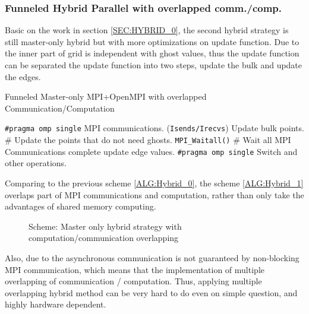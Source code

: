 \subsubsection{Funneled Hybrid Parallel with overlapped comm./comp.}\label{SEC:HYBRID_1}
Basic on the work in section \ref{SEC:HYBRID_0}, the second hybrid strategy is still master-only hybrid but with more optimizations on update 
function. 
Due to the inner part of grid is independent with ghost values, thus the update function can be separated the update function into two steps, 
update the bulk and update the edges.

\begin{algorithm}
  \caption{Funneled Master-only MPI+OpenMPI with overlapped Communication/Computation}
  \label{ALG:Hybrid_1}
  \begin{algorithmic}[1]
      \STATE \texttt{\#pragma omp single}
      \STATE MPI communications. (\texttt{Isends/Irecvs})
        \STATE Update bulk points.                                  \hfill \# Update the points that do not need ghosts.
      \ENDFOR
      \STATE \texttt{MPI\_Waitall()}                                \hfill \# Wait all MPI Communications complete
        \STATE update edge values.                                 
      \ENDFOR
      \STATE \texttt{\#pragma omp single} Switch and other operations.
    \ENDFOR
  \end{algorithmic}
\end{algorithm}
Comparing to the previous scheme \ref{ALG:Hybrid_0}, the scheme \ref{ALG:Hybrid_1} overlaps part of MPI communications and computation, 
rather than only take the advantages of shared memory computing.

\begin{figure}[htbp]
  \centering
  \caption{Scheme: Master only hybrid strategy with computation/communication overlapping}
  \label{FIG:master_only_hybrid_1}
\end{figure}
Also, due to the asynchronous communication is not guaranteed by non-blocking MPI communication,
which means that the implementation of multiple overlapping of communication / computation.
Thus, applying multiple overlapping hybrid method can be very hard to do even on simple question, and highly hardware dependent.



